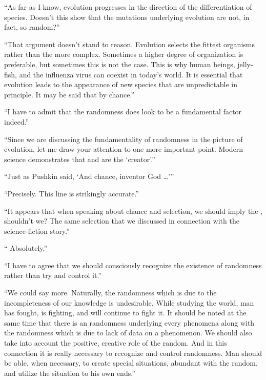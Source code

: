 \begin{dialogue}
\rdr  ``As far as I know, evolution progresses in the
  direction of the differentiation of species. Doesn't this show that
  the mutations underlying evolution are not, in fact, so random?''

\athr  ``That argument doesn't stand to reason. Evolution
  selects the fittest organisms rather than the more
  complex. Sometimes a higher degree of organization is preferable,
  but sometimes this is not the case. This is why human beings,
  jelly-fish, and the influenza virus can coexist in today's world. It
  is essential that evolution leads to the appearance of new species
  that are unpredictable in principle. It may be said that  by chance.''

\rdr  ``I have to admit that the randomness does look to be
a fundamental factor indeed.''

\athr  ``Since we are discussing the fundamentality of
  randomness in the picture of evolution, let me draw your attention
  to one more important point. Modern science demonstrates that
   and  are the `creator'.''

\rdr  ``Just as Pushkin said, `And chance, inventor God \ldots{}'''

\athr  ``Precisely. This line is strikingly accurate.''

\rdr  ``It appears that when speaking about chance and
  selection, we should imply the , shouldn't we? The same selection that we discussed in connection
  with the science-fiction story.''
  
\athr `` Absolutely.''

\rdr  ``I have to agree that we should consciously
  recognize the existence of randomness rather than try and control it.''

\athr  ``We could say more. Naturally, the randomness
  which is due to the incompleteness of our knowledge is
  undesirable. While studying the world, man has fought, is fighting,
  and will continue to fight it. It should be noted at the same time
  that there is an  randomness underlying every
  phenomena along with the  randomness which is due
  to lack of data on a phenomenon. We should also take into account
  the positive, creative role of the random. And in this connection it
  is really necessary to recognize and control randomness. Man should
  be able, when necessary, to create special situations, abundant with
  the random, and utilize the situation to his own ends.''


\end{dialogue}

